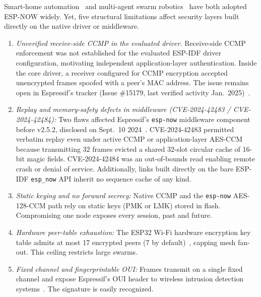 \documentclass[conference]{IEEEtran}
\begin{document}
Smart-home automation~\cite{cujilema2023} and multi-agent swarm robotics~\cite{caniago2026} have both adopted ESP-NOW widely. Yet, five structural limitations affect security layers built directly on the native driver or middleware.
\begin{enumerate}
\setlength{\itemsep}{0pt}\setlength{\parskip}{0pt}
\item \textit{Unverified receive-side CCMP in the evaluated driver.} Receive-side CCMP enforcement was not established for the evaluated ESP-IDF driver configuration, motivating independent application-layer authentication. Inside the core driver, a receiver configured for CCMP encryption accepted unencrypted frames spoofed with a peer's MAC address. The issue remains open in Espressif's tracker (Issue \#15179, last verified activity Jan.\ 2025)~\cite{espressif_issue15179}.
\item \textit{Replay and memory-safety defects in middleware (CVE-2024-42483 / CVE-2024-42484):} Two flaws affected Espressif's \texttt{esp-now} middleware component before v2.5.2, disclosed on Sept.\ 10 2024~\cite{nozomi2024,nvd_cve42483}. CVE-2024-42483 permitted verbatim replay even under active CCMP or application-layer AES-CCM because transmitting 32 frames evicted a shared 32-slot circular cache of 16-bit magic fields. CVE-2024-42484 was an out-of-bounds read enabling remote crash or denial of service. Additionally, links built directly on the bare ESP-IDF \texttt{esp\_now} API inherit no sequence cache of any kind.
\item \textit{Static keying and no forward secrecy:} Native CCMP and the \texttt{esp-now} AES-128-CCM path rely on static keys (PMK or LMK) stored in flash. Compromising one node exposes every session, past and future.
\item \textit{Hardware peer-table exhaustion:} The ESP32 Wi-Fi hardware encryption key table admits at most 17 encrypted peers (7 by default)~\cite{espressif_espnow}, capping mesh fan-out. This ceiling restricts large swarms.
\item \textit{Fixed channel and fingerprintable OUI:} Frames transmit on a single fixed channel and expose Espressif's OUI header to wireless intrusion detection systems~\cite{guardianair2024}. The signature is easily recognized.
\end{enumerate}
\end{document}
